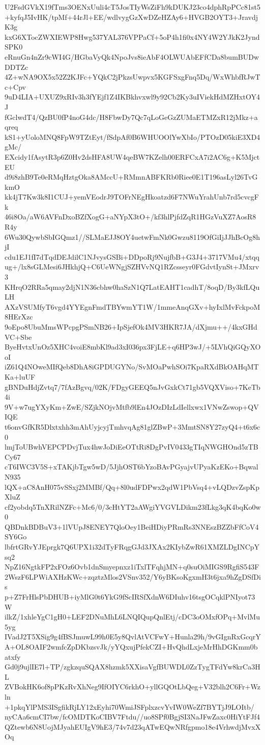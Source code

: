 U2FsdGVkX19fTms3OENxUuli4cT5JosTIyWsZiFh9kDUKJ23co4dphRpPCc81st5
+kyfqJ5IvHK/tpMf+44rJl+EE/wdlvygGzXwDZeHZAy6+HVGB2OYT3+JravdjK3g
kxG6XTocZWXIEWP8Hwg537YAL376VPPaCf+5oP4h1fi0x4NY4W2YJkK2JyndSPK0
eRnuGn4nZr9cWI4G/HGbaVyQk4NpoJvs8ieAbF4OLWUAbEFfCDa8bumBUDwDDTZc
4Z+wNA9OX5x52Z2KJFc+YQkC2jPkzsUwpvx5KGFSxgFnq5Dq/WxWhbfRJwTc+Cpv
9uD4LIA+UXUZ9xRIv3h3fYEjf1Z4IKBkhvxwl9y92Cb2Ky3uIViekHdMZHxtOY4J
fGclwdT4/QzBU0fP4noG4dc/H8FbwDy7Qc7qLoGeGzZUMaETMZxR12jMkz+aqreq
kS1+yUoloMNQ8FpW9TZtEyt/fSdpAf0B6WHUOOlYwXbIo/PTOzD05kiE3XD4gMc/
EXcidy1fAsytR3p6Z0Hv2dsHFA8UW4qeBW7KZelh00ERFCxA7i2AC6g+K5MjctEU
d9i8zhB9Te0eRMqHztgOka8AMccU+RMmnABFKRb0Riee0E1T196asLyl26TvGkmO
kk4jT7Kw3k8I1CUJ+yemVEodrJ9TOFrNEgHkoatzd6F7NWuYrahUnb7rd5cvcgFk
46i8Oa/aW6AVFnDxoBZfXogG+aNYpX3tO+/kf3hlPjfdZqR1HGzVuXZ7AosR8R4y
6Wu30QywbSbIGQmz1//SLMaEJJ8OY4uetwFmNk0Gwzu8119OfGiIjJJhBcOg8hjI
cdu1EJ1fI7dTqdDEJdilC1NJvysGSBi+DDpoRj9NujfbB+G3J4+3717VMu4/xtqq
ug+/lx8sGLMesi6JHkhjQ+C6UeWNgjSZHVvNQ1RZcsseyr0FGdvtIynSt+JMxrv3
KHrqO2RRa5qmay2djN1N36cbhw0haSzN1Q7LatEAHT1cadhT/8oqD/By3kfLQuLH
AXzVSUMfyT6vgd4YYEgnFmdTBYwmYT1W/1mmeAnqGXv+hyIxlMvFckpoM8HErXzc
9oEpo8UbuMmsWPcpgPSmNB26+IpSjefOk4MV3HKR7JA/dXjmu++/4kxGHdVC+Sbe
ByeHvtxUnOz5XHC4voiE8mbKl9ad3xI036px3FjLE+q6HP3wJ/+5LVhQiGQyXOoI
iZ61Q4NOweMIfQeb8DhA8iGPDUGYNo/SvMOaPwhSOi7KpaRXdBkOAHqMTKa+luUF
gBNDuHdjZvtq7/7fAzBgvq/02K/FDgyGEEQ5nJvGxkCt71gb5VQXViso+7KeTb4i
9V+w7ugYXyKm+ZwE/SZjkNOjvMtfb9lEn4JOzDIzLdIellxwx1VNwZswop+QVIQE
t6onvGfKR5Dlxtxhh3mAhUyjcyjTmhvqAg81glZBwP+3MmtSN8Y27zyQ4+t6x6c0
lmjToUBwhVEPCPDvjTux4hwJoDiEeOTtRi8DgPvIV0433gTIqNWGHOnd5zTBCy67
cT6IWC3V5S+xTAKjbTgw5wD/5JjhOST6bYzoBAvPGyajvUPyaKzEKo+BqwalN935
lQX+aC8AnH075vSSxj2MMBf/Qq+8l0udFDPwx2qdW1PbVsq4+vLQDzvZspKpXluZ
cf2yobdq5TnXRilNZFc+Mc6/0/3cHtYT2aAWgiYVGVLDikm23fLkg3qK4bqKo0w0
QBDnkBDBuV3+1lVUpJ8ENEY7QloOey1BeiHDiyPRmRs3NNEszBZZbFfCoV4SY6Go
lbfrtGRvYJEprgk7Q6UPX1i32dTyFRqgGJd3JXAx2KIybZwR61XMZLDgINCpYsq2
NpZ16NgtkFP2xFOz6Ovb1dnSmyepnxz1iTxlTFqhjMN+q0suOiMIGS9RgfiS543F
2WszF6LPWiAXHzKWc+zqztzMlos2VSnv352/Y6yBKsoKgxmH3t6jxa9hZgDSfDis
p+Z7FrHlsPbDHUB+iyMlG0t6YkG9fScIRSfXdnW6DIuhv16tsgOCqklPNIyot73W
ilkZ/1xhleYgC1gH0+LEF2DNuMhL6LNQIQupQnlEtj/cDC3oOMxfOPq+MvlMu5yg
IVadJ2T5XSig9g4fBSJmuwL99h0E5y8QvlAtVCFwY+Hunla29h/9vGIgnRxGcqrY
A+OL8OAIF2wmfcZpDKbzsvJk/yYQxujPfekCZI+HvQhdLxjeMrHhDGKmm0batxfy
Gd0j9ujlIE7l+TP/zgkzquSQAX8hzmk5XXisaVgfBUWDL0ZzTygTFdYw8krCa3HL
ZVBokHK6of8pPKzRvXhNeg9IfOIYC6rkhO+yllGQOtLbQeg+V32blh2C6Fr+Wzln
+1pkqYlPMS3ISgfikRjLY12xEyhi70WmiJSFplxzcvYvIW0WeZf7BYTjJ9LOItb/
nyCAa6cmCI7bw/fcOMDTKoCIBV7Ftdu//uo8SPf0BgjSI3NaJFwZaxc0HiYtFJf4
QZtewb6N8UojMJyahEUIgV9hE3/74v7d23qATwEQwNRfgpmo18e4VrhwdjMvxXOq
